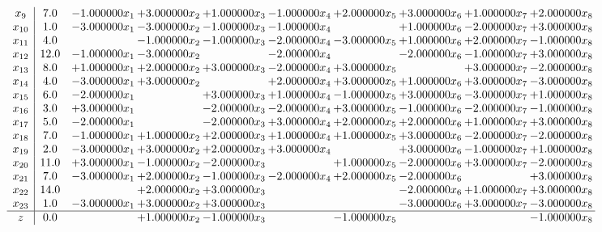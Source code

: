 \documentclass[10pt]{article}
\begin{document}
\[\begin{array}{c| c c@{\hskip 2pt} c@{\hskip 2pt} c@{\hskip 2pt} c@{\hskip 2pt} c@{\hskip 2pt} c@{\hskip 2pt} c@{\hskip 2pt} c@{\hskip 2pt} }
 x_{9}   &  7.0 & -1.000000 x_{1} & + 3.000000 x_{2} & + 1.000000 x_{3} & -1.000000 x_{4} & + 2.000000 x_{5} & + 3.000000 x_{6} & + 1.000000 x_{7} & + 2.000000 x_{8}\\
 x_{10}   &  1.0 & -3.000000 x_{1} & -3.000000 x_{2} & -1.000000 x_{3} & -1.000000 x_{4} &   & + 1.000000 x_{6} & -2.000000 x_{7} & + 3.000000 x_{8}\\
 x_{11}   &  4.0  &   & -1.000000 x_{2} & -1.000000 x_{3} & -2.000000 x_{4} & -3.000000 x_{5} & + 1.000000 x_{6} & + 2.000000 x_{7} & -1.000000 x_{8}\\
 x_{12}   &  12.0 & -1.000000 x_{1} & -3.000000 x_{2} &   & -2.000000 x_{4} &   & -2.000000 x_{6} & -1.000000 x_{7} & + 3.000000 x_{8}\\
 x_{13}   &  8.0 & + 1.000000 x_{1} & + 2.000000 x_{2} & + 3.000000 x_{3} & -2.000000 x_{4} & + 3.000000 x_{5} &   & + 3.000000 x_{7} & -2.000000 x_{8}\\
 x_{14}   &  4.0 & -3.000000 x_{1} & + 3.000000 x_{2} &   & + 2.000000 x_{4} & + 3.000000 x_{5} & + 1.000000 x_{6} & + 3.000000 x_{7} & -3.000000 x_{8}\\
 x_{15}   &  6.0 & -2.000000 x_{1} &   & + 3.000000 x_{3} & + 1.000000 x_{4} & -1.000000 x_{5} & + 3.000000 x_{6} & -3.000000 x_{7} & + 1.000000 x_{8}\\
 x_{16}   &  3.0 & + 3.000000 x_{1} &   & -2.000000 x_{3} & -2.000000 x_{4} & + 3.000000 x_{5} & -1.000000 x_{6} & -2.000000 x_{7} & -1.000000 x_{8}\\
 x_{17}   &  5.0 & -2.000000 x_{1} &   & -2.000000 x_{3} & + 3.000000 x_{4} & + 2.000000 x_{5} & + 2.000000 x_{6} & + 1.000000 x_{7} & + 3.000000 x_{8}\\
 x_{18}   &  7.0 & -1.000000 x_{1} & + 1.000000 x_{2} & + 2.000000 x_{3} & + 1.000000 x_{4} & + 1.000000 x_{5} & + 3.000000 x_{6} & -2.000000 x_{7} & -2.000000 x_{8}\\
 x_{19}   &  2.0 & -3.000000 x_{1} & + 3.000000 x_{2} & + 2.000000 x_{3} & + 3.000000 x_{4} &   & + 3.000000 x_{6} & -1.000000 x_{7} & + 1.000000 x_{8}\\
 x_{20}   &  11.0 & + 3.000000 x_{1} & -1.000000 x_{2} & -2.000000 x_{3} &   & + 1.000000 x_{5} & -2.000000 x_{6} & + 3.000000 x_{7} & -2.000000 x_{8}\\
 x_{21}   &  7.0 & -3.000000 x_{1} & + 2.000000 x_{2} & -1.000000 x_{3} & -2.000000 x_{4} & + 2.000000 x_{5} & -2.000000 x_{6} &   & + 3.000000 x_{8}\\
 x_{22}   &  14.0  &   & + 2.000000 x_{2} & + 3.000000 x_{3} &    &   & -2.000000 x_{6} & + 1.000000 x_{7} & + 3.000000 x_{8}\\
 x_{23}   &  1.0 & -3.000000 x_{1} & + 3.000000 x_{2} & + 3.000000 x_{3} &    &   & -3.000000 x_{6} & + 3.000000 x_{7} & -3.000000 x_{8}\\
\hline
z    &  0.0  &   & + 1.000000 x_{2} & -1.000000 x_{3} &   & -1.000000 x_{5} &    &   & -1.000000 x_{8}\\
\end{array}\]
\end{document}
